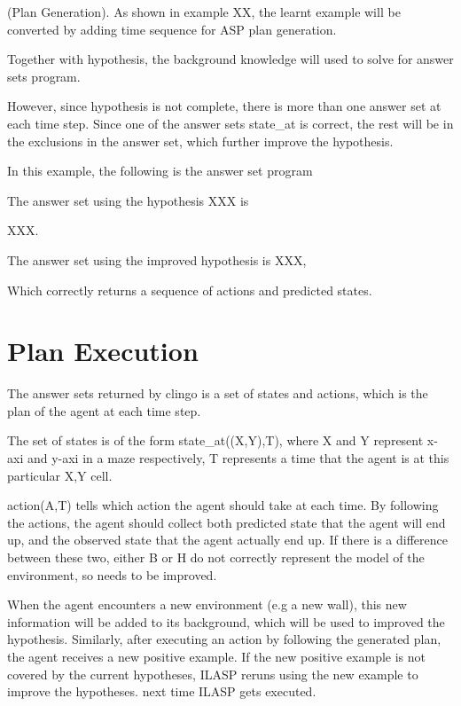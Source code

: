 \begin{examp} \normalfont (Plan Generation).
As shown in example XX, the learnt example will be converted by adding time sequence for ASP plan generation.

Together with hypothesis, the background knowledge will used to solve for answer sets program. 

However, since hypothesis is not complete, there is more than one answer set at each time step. Since one of the answer sets state\_at is correct, the rest will be in the exclusions in the answer set, 
which further improve the hypothesis.


In this example, the following is the answer set program

The answer set using the hypothesis XXX is 

XXX. 

The answer set using the improved hypothesis is XXX, 

Which correctly returns a sequence of actions and predicted states. 

\end{examp}

\section{Plan Execution}
\label{Plan execution}

The answer sets returned by clingo is a set of states and actions, which is the plan of the agent at each time step.

The set of states is of the form state\_at((X,Y),T), where X and Y represent x-axi and y-axi in a maze respectively, T represents a time that the agent is at
this particular X,Y cell.

action(A,T) tells which action the agent should take at each time. By following the actions, the agent should collect both predicted state that the
agent will end up, and the observed state that the agent actually end up. If there is a difference between these two, either B or H do not correctly represent
the model of the environment, so needs to be improved.

When the agent encounters a new environment (e.g a new wall), this new information will be added to its background, which will be used to improved the hypothesis. 
Similarly, after executing an action by following the generated plan, the agent receives a new positive example. If the new positive example is not covered by the current hypotheses, 
ILASP reruns using the new example to improve the hypotheses. 
next time ILASP gets executed.

